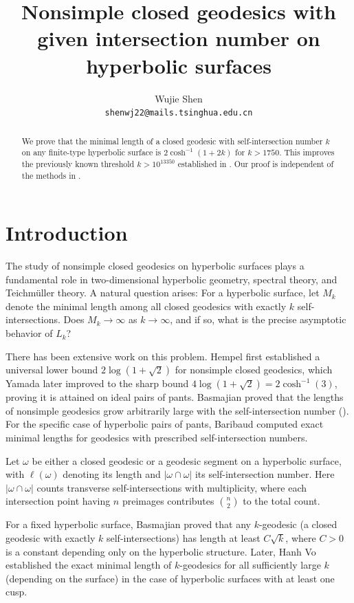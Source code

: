 \documentclass[11pt, a4paper]{article}
\author{
	Wujie Shen\\
	\texttt{shenwj22@mails.tsinghua.edu.cn}
}
\title{Nonsimple closed geodesics with given intersection number on hyperbolic surfaces}
\theoremstyle{definition}
\theoremstyle{remark}
\begin{document}
\maketitle

\begin{abstract}
We prove that the minimal length of a closed geodesic with self-intersection number $k$ on any finite-type hyperbolic surface is $2\cosh^{-1}(1+2k)$ for $k>1750$. This improves the previously known threshold $k > 10^{13350}$ established in \cite{Y2801}. Our proof is independent of the methods in \cite{Y2801}.
\end{abstract}

\section{Introduction}

The study of nonsimple closed geodesics on hyperbolic surfaces plays a fundamental role in two-dimensional hyperbolic geometry, spectral theory, and Teichmüller theory. A natural question arises: For a hyperbolic surface, let $M_k$ denote the minimal length among all closed geodesics with exactly $k$ self-intersections. Does $M_k \to \infty$ as $k \to \infty$, and if so, what is the precise asymptotic behavior of $L_k$?

There has been extensive work on this problem. Hempel \cite{H2797} first established a universal lower bound $2\log(1+\sqrt{2})$ for nonsimple closed geodesics, which Yamada \cite{Y2799} later improved to the sharp bound $4\log(1+\sqrt{2}) = 2\cosh^{-1}(3)$, proving it is attained on ideal pairs of pants. Basmajian \cite{B2794} proved that the lengths of nonsimple geodesics grow arbitrarily large with the self-intersection number (\cite[Corollary 1.2]{B2794}). For the specific case of hyperbolic pairs of pants, Baribaud \cite{B2795} computed exact minimal lengths for geodesics with prescribed self-intersection numbers.

Let $\omega$ be either a closed geodesic or a geodesic segment on a hyperbolic surface, with $\ell(\omega)$ denoting its length and $|{\omega\cap\omega}|$ its self-intersection number. Here $|{\omega\cap\omega}|$ counts transverse self-intersections with multiplicity, where each intersection point having $n$ preimages contributes $\binom{n}{2}$ to the total count.

For a fixed hyperbolic surface, Basmajian \cite{B2803} proved that any $k$-geodesic (a closed geodesic with exactly $k$ self-intersections) has length at least $C\sqrt{k}$, where $C > 0$ is a constant depending only on the hyperbolic structure. Later, Hanh Vo \cite{Y2805} established the exact minimal length of $k$-geodesics for all sufficiently large $k$ (depending on the surface) in the case of hyperbolic surfaces with at least one cusp.
\end{document}
